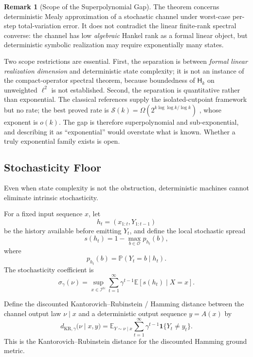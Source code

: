 \documentclass[12pt]{article}
\theoremstyle{definition}
\newtheorem{remark}[theorem]{Remark}
\begin{document}
\begin{remark}[Scope of the Superpolynomial Gap]
\label{rem:exp-gap-scope}
The theorem concerns deterministic Mealy approximation of a stochastic channel
under worst-case per-step total-variation error.  It does not contradict the
linear finite-rank spectral converse: the channel has low \emph{algebraic}
Hankel rank as a formal linear object, but deterministic symbolic realization
may require exponentially many states.

Two scope restrictions are essential.  First, the separation is between
\emph{formal linear realization dimension} and deterministic state complexity;
it is not an instance of the compact-operator spectral theorem, because
boundedness of $\mathsf H_k$ on unweighted $\ell^2$ is not established.
Second, the separation is quantitative rather than exponential.  The classical
references \cite{rabin1963,freivalds1981} supply the isolated-cutpoint
framework but no rate; the best proved rate is
$\mathcal S(k)=\Omega(2^{k\log\log k/\log k})$ \cite{ambainis1996}, whose
exponent is $o(k)$.  The gap is therefore superpolynomial and sub-exponential,
and describing it as ``exponential'' would overstate what is known.  Whether a
truly exponential family exists is open.
\end{remark}

\subsection{Stochasticity Floor}
\label{subsec:stochasticity-floor}

Even when state complexity is not the obstruction, deterministic machines
cannot eliminate intrinsic stochasticity.

For a fixed input sequence $x$, let
\[
h_t=(x_{1:t},Y_{1:t-1})
\]
be the history available before emitting $Y_t$, and define the local
stochastic spread
\[
s(h_t)
=
1-\max_{b\in\mathcal O}p_{h_t}(b),
\]
where
\[
p_{h_t}(b)
=
\mathbb P(Y_t=b\mid h_t).
\]
The stochasticity coefficient is
\[
\sigma_\gamma(\nu)
=
\sup_{x\in\mathcal I^{\mathbb N}}
\sum_{t=1}^\infty
\gamma^{t-1}
\mathbb E[s(h_t)\mid X=x].
\]

Define the discounted Kantorovich--Rubinstein / Hamming distance between the
channel output law $\nu\mid x$ and a deterministic output sequence
$y=A(x)$ by
\[
d_{\mathrm{KR},\gamma}
\bigl(
\nu\mid x,y
\bigr)
=
\mathbb E_{Y\sim\nu\mid x}
\sum_{t=1}^\infty
\gamma^{t-1}
\mathbf 1\{Y_t\neq y_t\}.
\]
This is the Kantorovich--Rubinstein distance for the discounted Hamming ground
metric.
\end{document}
